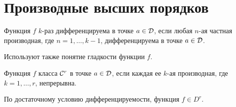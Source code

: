 	
	\section{Производные высших порядков}
	\begin{mdef}
		Функция $f$ $k$-раз дифференцируема в точке $a \in \mathcal{D}$, если любая $n$-ая частная производная, где $n=1,\ldots,k-1$, дифференцируема в точке $a \in \mathcal{D}$.
	\end{mdef}
	\begin{remark}
		Используют также понятие гладкости функции $f$. 
		
		Функция $f$ класса $\mathcal{C}^r$ в точке $a\in \mathcal{D}$, если каждая ее $k$-ая производная, где $k=1,\ldots,r$, непрерывна.
		
		По достаточному условию дифференцируемости, функция $f \in D^{r}$.
	\end{remark}

